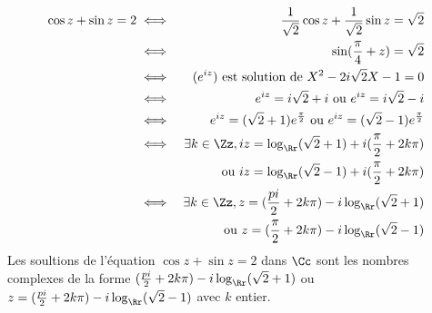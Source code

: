 {\begin{enumerate}
{\begin{eqnarray*}
 \cos z+\sin z=2&\iff& \frac{1}{\sqrt{2}}\cos z+\frac{1}{\sqrt{2}}\sin z=\sqrt{2}\\
 &\iff& \sin (\frac{\pi}{4}+z)=\sqrt{2}\\
 &\iff& (e^{iz}) \textrm{ est solution de }X^2-2i\sqrt{2}X-1=0\\
 &\iff& e^{iz}=i\sqrt{2}+i \textrm { ou } e^{iz}=i\sqrt{2}-i\\
 &\iff& e^{iz}=(\sqrt{2}+1)e^{\frac{\pi}{2}} \textrm { ou } e^{iz}=(\sqrt{2}-1)e^{\frac{\pi}{2}}\\
 &\iff&\exists k\in\Zz, iz=\log_\Rr(\sqrt{2}+1)+i(\frac{\pi}{2}+2k\pi) \\&& \textrm { ou } iz=\log_\Rr(\sqrt{2}-1)+i(\frac{\pi}{2}+2k\pi)\\
 &\iff&\exists k\in\Zz, z=(\frac{pi}{2}+2k\pi)-i\log_\Rr(\sqrt{2}+1) \\&& \textrm { ou } z=(\frac{\pi}{2}+2k\pi)-i\log_\Rr(\sqrt{2}-1)
\end{eqnarray*}
Les soultions de l'équation $\cos z+\sin z=2$ dans $\Cc$ sont les nombres complexes de la forme
$(\frac{pi}{2}+2k\pi)-i\log_\Rr(\sqrt{2}+1)$ ou $z=(\frac{pi}{2}+2k\pi)-i\log_\Rr(\sqrt{2}-1)$
avec $k$ entier.}
\end{enumerate}
}
